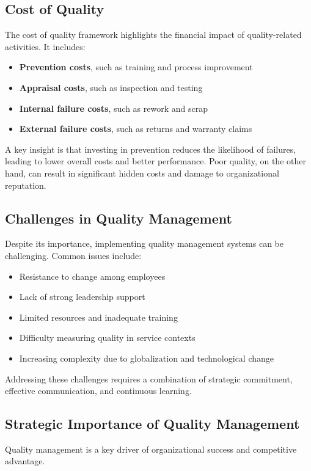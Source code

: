 \documentclass[12pt,a4paper]{article}
\begin{document}
\subsection*{Cost of Quality}
The cost of quality framework highlights the financial impact of quality-related activities. It includes:
\begin{itemize}
    \item \textbf{Prevention costs}, such as training and process improvement
    \item \textbf{Appraisal costs}, such as inspection and testing
    \item \textbf{Internal failure costs}, such as rework and scrap
    \item \textbf{External failure costs}, such as returns and warranty claims
\end{itemize}

A key insight is that investing in prevention reduces the likelihood of failures, leading to lower overall costs and better performance. Poor quality, on the other hand, can result in significant hidden costs and damage to organizational reputation.

\subsection*{Challenges in Quality Management}
Despite its importance, implementing quality management systems can be challenging. Common issues include:
\begin{itemize}
    \item Resistance to change among employees
    \item Lack of strong leadership support
    \item Limited resources and inadequate training
    \item Difficulty measuring quality in service contexts
    \item Increasing complexity due to globalization and technological change
\end{itemize}

Addressing these challenges requires a combination of strategic commitment, effective communication, and continuous learning.

\subsection*{Strategic Importance of Quality Management}
Quality management is a key driver of organizational success and competitive advantage.
\end{document}
